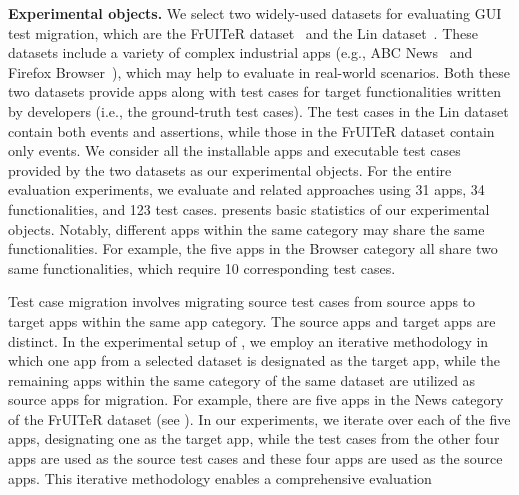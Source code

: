 \textbf{Experimental objects.} 
We select two widely-used datasets for evaluating GUI test migration, which are the FrUITeR dataset~\cite{fruiter-dataset} and the Lin dataset~\cite{craftdroid-dataset}. These datasets include a variety of complex industrial apps (e.g., ABC News~\cite{abc-news} and Firefox Browser~\cite{firefox}), which may help to evaluate \toolNameSmall{} in real-world scenarios. Both these two datasets provide apps along with test cases for target functionalities written by developers (i.e., the ground-truth test cases). The test cases in the Lin dataset contain both events and assertions, while those in the FrUITeR dataset contain only events. We consider all the installable apps and executable test cases provided by the two datasets as our experimental objects.
For the entire evaluation experiments, we evaluate \toolNameSmall{} and related approaches using 31 apps, 34 functionalities, and 123 test cases.  presents basic statistics of our experimental objects. 
Notably, different apps within the same category may share the same functionalities. For example, the five apps in the Browser category all share two same functionalities, which require 10 corresponding test cases. 

Test case migration involves migrating source test cases from source apps to target apps within the same app category. The source apps and target apps are distinct. 
In the experimental setup of \toolNameSmall{}, we employ an iterative methodology in which one app from a selected dataset is designated as the target app, while the remaining apps within the same category of the same dataset are utilized as source apps for migration.
For example, there are five apps in the News category of the FrUITeR dataset (see ). In our experiments, we iterate over each of the five apps, designating one as the target app, while the test cases from the other four apps are used as the source test cases and these four apps are used as the source apps.  This iterative methodology enables a comprehensive evaluation









